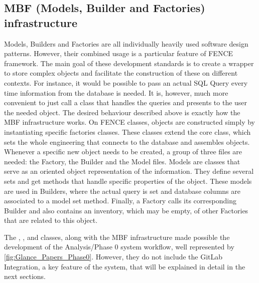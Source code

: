 \subsection{MBF (Models, Builder and Factories) infrastructure}
\label{sec:MBF_Models_Builder_and_Factories_infrastructure}

Models, Builders and Factories are all individually heavily used software design patterns.
However, their combined usage is a particular feature of FENCE framework.
The main goal of these development standards is to create a wrapper to store complex objects and facilitate the construction of these on different contexts.
For instance, it would be possible to pass an actual SQL Query every time information from the database is needed.
It is, however, much more convenient to just call a class that handles the queries and presents to the user the needed object.
The desired behaviour described above is exactly how the MBF infrastructure works.
On FENCE classes, objects are constructed simply by instantiating specific factories classes.
These classes extend the core  class, which sets the whole engineering that connects to the database and assembles objects.
Whenever a specific new object needs to be created, a group of three files are needed: the Factory, the Builder and the Model files. 
Models are classes that serve as an oriented object representation of the information. They define several sets and get methods that handle specific properties of the object. These models are used in Builders, where the actual query is set and database columns are associated to a model set method. Finally, a Factory calls its corresponding Builder and also contains an inventory, which may be empty, of other Factories that are related to this object.

The , ,  and  classes, along with the MBF infrastructure made possible the development of the Analysis/Phase 0 system workflow, well represented by \cref{fig:Glance_Papers_Phase0}.
However, they do not include the GitLab Integration, a key feature of the system, that will be explained in detail in the next sections.
